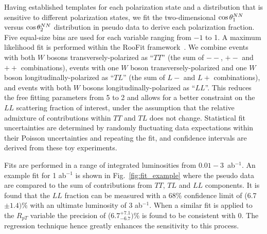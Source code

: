 Having established templates for each polarization state and a
distribution that is sensitive to different polarization states, 
we fit the two-dimensional $ \cos \theta^{NN}  _1$ versus $ \cos \theta^{NN}  _2$
distribution in pseudo data to derive each polarization fraction. Five equal-size bins 
are used for each \ctsNN variable ranging from $-1$ to 1. A maximum likelihood fit is performed 
within the RooFit framework~\cite{RooFit}. We combine events with both $W$ bosons transversely-polarized as
``$TT$'' (the sum of $--$, $+-$ and $++$ combinations), events with
one $W$ boson transversely-polarized and one $W$ boson
longitudinally-polarized as ``$TL$'' (the sum of $L-$ and $L+$
combinations), and events with both $W$ bosons
longitudinally-polarized as ``$LL$''. This reduces the free fitting parameters from 5 to 2 and 
allows for a better constraint on the $LL$ scattering fraction of interest, under the assumption that
the relative admixture of contributions within $TT$ and $TL$ does not change. Statistical fit uncertainties are determined by randomly
fluctuating data expectations within their Poisson uncertainties and
repeating the fit, and confidence intervals are derived from these toy experiments.  


Fits are performed in a range of integrated luminosities from $0.01-3$~ab$^{-1}$. An example fit for 1 ab$^{-1}$ is shown in Fig.~\ref{fig:fit_example} where the pseudo data are compared to the sum of 
contributions from $TT$, $TL$ and $LL$ components. It is found that the $LL$ fraction can be measured with a 68\% confidence limit of (6.7$\pm 1.4)\%$ with an ultimate luminosity of 3 ab$^{-1}$. When a similar fit is applied to the $R_{pT}$ variable the precision of (6.7$^{+7.1}_{- 6.7})\%$ is found to be consistent with 0. The regression technique hence greatly enhances the sensitivity to this process.


